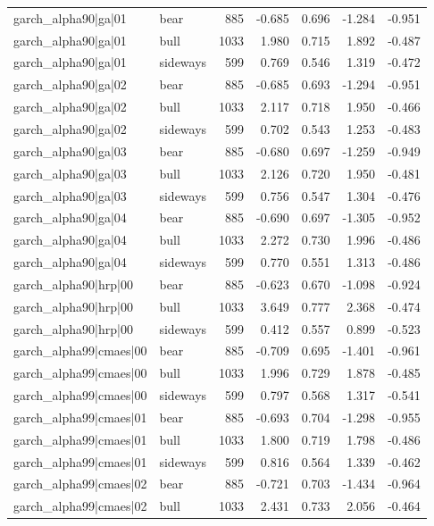 \begin{table}
\begin{tabular}{llrrrrr}
garch\_alpha90|ga|01 & bear & 885 & -0.685 & 0.696 & -1.284 & -0.951 \\
garch\_alpha90|ga|01 & bull & 1033 & 1.980 & 0.715 & 1.892 & -0.487 \\
garch\_alpha90|ga|01 & sideways & 599 & 0.769 & 0.546 & 1.319 & -0.472 \\
garch\_alpha90|ga|02 & bear & 885 & -0.685 & 0.693 & -1.294 & -0.951 \\
garch\_alpha90|ga|02 & bull & 1033 & 2.117 & 0.718 & 1.950 & -0.466 \\
garch\_alpha90|ga|02 & sideways & 599 & 0.702 & 0.543 & 1.253 & -0.483 \\
garch\_alpha90|ga|03 & bear & 885 & -0.680 & 0.697 & -1.259 & -0.949 \\
garch\_alpha90|ga|03 & bull & 1033 & 2.126 & 0.720 & 1.950 & -0.481 \\
garch\_alpha90|ga|03 & sideways & 599 & 0.756 & 0.547 & 1.304 & -0.476 \\
garch\_alpha90|ga|04 & bear & 885 & -0.690 & 0.697 & -1.305 & -0.952 \\
garch\_alpha90|ga|04 & bull & 1033 & 2.272 & 0.730 & 1.996 & -0.486 \\
garch\_alpha90|ga|04 & sideways & 599 & 0.770 & 0.551 & 1.313 & -0.486 \\
garch\_alpha90|hrp|00 & bear & 885 & -0.623 & 0.670 & -1.098 & -0.924 \\
garch\_alpha90|hrp|00 & bull & 1033 & 3.649 & 0.777 & 2.368 & -0.474 \\
garch\_alpha90|hrp|00 & sideways & 599 & 0.412 & 0.557 & 0.899 & -0.523 \\
garch\_alpha99|cmaes|00 & bear & 885 & -0.709 & 0.695 & -1.401 & -0.961 \\
garch\_alpha99|cmaes|00 & bull & 1033 & 1.996 & 0.729 & 1.878 & -0.485 \\
garch\_alpha99|cmaes|00 & sideways & 599 & 0.797 & 0.568 & 1.317 & -0.541 \\
garch\_alpha99|cmaes|01 & bear & 885 & -0.693 & 0.704 & -1.298 & -0.955 \\
garch\_alpha99|cmaes|01 & bull & 1033 & 1.800 & 0.719 & 1.798 & -0.486 \\
garch\_alpha99|cmaes|01 & sideways & 599 & 0.816 & 0.564 & 1.339 & -0.462 \\
garch\_alpha99|cmaes|02 & bear & 885 & -0.721 & 0.703 & -1.434 & -0.964 \\
garch\_alpha99|cmaes|02 & bull & 1033 & 2.431 & 0.733 & 2.056 & -0.464 \\

\end{tabular}
\end{table}
